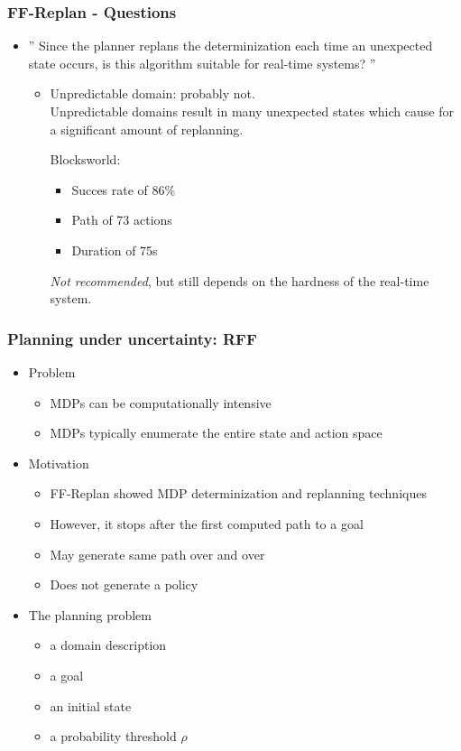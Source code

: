 \documentclass{beamer}
\let\origframetitle=\frametitle
\renewcommand\frametitle[1]{\origframetitle{\textbf{\large{\textrm{#1}}}}}
\begin{document}
\begin{frame}
  \frametitle{FF-Replan - Questions}
  \begin{itemize}
	\item '' Since the planner replans the determinization each time an unexpected state occurs, is this algorithm suitable for real-time systems? ''

	\begin{itemize}
		\item Unpredictable domain: probably not. \\
Unpredictable domains result in many unexpected states which cause for a significant amount of replanning.

Blocksworld:
\begin{itemize}
	\item Succes rate of 86\%
	\item Path of 73 actions
	\item Duration of 75s
\end{itemize}

\emph{Not recommended}, but still depends on the hardness of the real-time system.

	\end{itemize}

   \end{itemize}
\end{frame}



\begin{frame}
  \frametitle{Planning under uncertainty: RFF}

  \begin{itemize}
    \item Problem
      \begin{itemize}
        \item MDPs can be computationally intensive
        \item MDPs typically enumerate the entire state and action space
      \end{itemize}
    \item Motivation
      \begin{itemize}
        \item FF-Replan showed MDP determinization and replanning techniques
        \item However, it stops after the first computed path to a goal
        \item May generate same path over and over
        \item Does not generate a policy
      \end{itemize}
    \item The planning problem
      \begin{itemize}
        \item a domain description
        \item a goal
        \item an initial state
        \item a probability threshold $\rho$
      \end{itemize}
  \end{itemize}

\end{frame}
\end{document}
